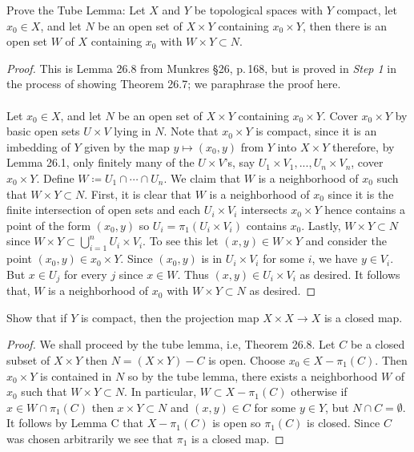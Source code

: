 \begin{problem}
Prove the Tube Lemma: Let $X$ and $Y$ be topological spaces with
$Y$ compact, let $x_0\in X$, and let $N$ be an open set of
$X\times Y$ containing $x_0\times Y$, then there is an open set
$W$ of $X$ containing $x_0$ with $W\times Y\subset
N$.
\end{problem}
\begin{proof}
This is Lemma 26.8 from Munkres \S26, p.\,168, but is proved in \emph{Step
  1} in the process of showing Theorem 26.7; we paraphrase the proof here.
\\\\
Let $x_0\in X$, and let $N$ be an open set of $X\times Y$ containing
$x_0\times Y$. Cover $x_0\times Y$ by basic open sets $U\times V$ lying in
$N$. Note that $x_0\times Y$ is compact, since it is an imbedding of $Y$
given by the map $y\mapsto (x_0,y)$ from $Y$ into $X\times Y$ therefore, by
Lemma 26.1, only finitely many of the $U\times V$'s, say $U_1\times
V_1,...,U_n\times V_n$, cover $x_0\times Y$. Define $W\coloneqq
U_1\cap\cdots\cap U_n$. We claim that $W$ is a neighborhood of $x_0$ such
that $W\times Y\subset N$. First, it is clear that $W$ is a neighborhood of
$x_0$ since it is the finite intersection of open sets and each $U_i\times
V_i$ intersects $x_0\times Y$ hence contains a point of the form $(x_0,y)$
so $U_i=\pi_1(U_i\times V_i)$ contains $x_0$. Lastly, $W\times Y\subset N$
since $W\times Y\subset\bigcup_{i=1}^n U_i\times V_i$. To see this let
$(x,y)\in W\times Y$ and consider the point $(x_0,y)\in x_0\times Y$. Since
$(x_0,y)$ is in $U_i\times V_i$ for some $i$, we have $y\in V_i$. But $x\in
U_j$ for every $j$ since $x\in W$. Thus $(x,y)\in U_i\times V_i$ as
desired. It follows that, $W$ is a neighborhood of $x_0$ with $W\times
Y\subset N$ as desired.
\end{proof}
\begin{problem}
Show that if $Y$ is compact, then the projection map $X\times
X\to X$ is a closed map.
\end{problem}
\begin{proof}
We shall proceed by the tube lemma, i.e, Theorem 26.8. Let $C$ be a closed
subset of $X\times Y$ then $N=(X\times Y)-C$ is open. Choose $x_0\in
X-\pi_1(C)$. Then $x_0\times Y$ is contained in $N$ so by the tube lemma,
there exists a neighborhood $W$ of $x_0$ such that $W\times
Y\subset N$. In particular, $W\subset X-\pi_1(C)$ otherwise if
$x\in W\cap\pi_1(C)$ then $x\times Y\subset N$ and $(x,y)\in C$
for some $y\in Y$, but $N\cap C=\emptyset$. It follows by Lemma C
that $X-\pi_1(C)$ is open so $\pi_1(C)$ is closed. Since $C$ was
chosen arbitrarily we see that $\pi_1$ is a closed map.
\end{proof}
